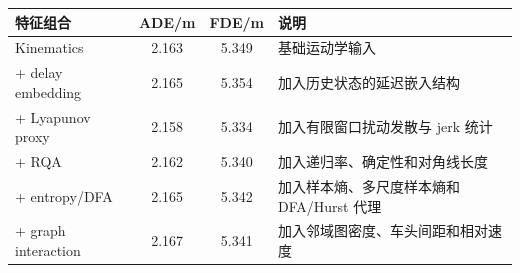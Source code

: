 \begin{tabularx}{\textwidth}{lccX}
\toprule
特征组合 & ADE/m & FDE/m & 说明 \\ 
\midrule
Kinematics & 2.163 & 5.349 & 基础运动学输入 \\ 
+ delay embedding & 2.165 & 5.354 & 加入历史状态的延迟嵌入结构 \\ 
+ Lyapunov proxy & 2.158 & 5.334 & 加入有限窗口扰动发散与 jerk 统计 \\ 
+ RQA & 2.162 & 5.340 & 加入递归率、确定性和对角线长度 \\ 
+ entropy/DFA & 2.165 & 5.342 & 加入样本熵、多尺度样本熵和 DFA/Hurst 代理 \\ 
+ graph interaction & 2.167 & 5.341 & 加入邻域图密度、车头间距和相对速度 \\ 
\bottomrule
\end{tabularx}
